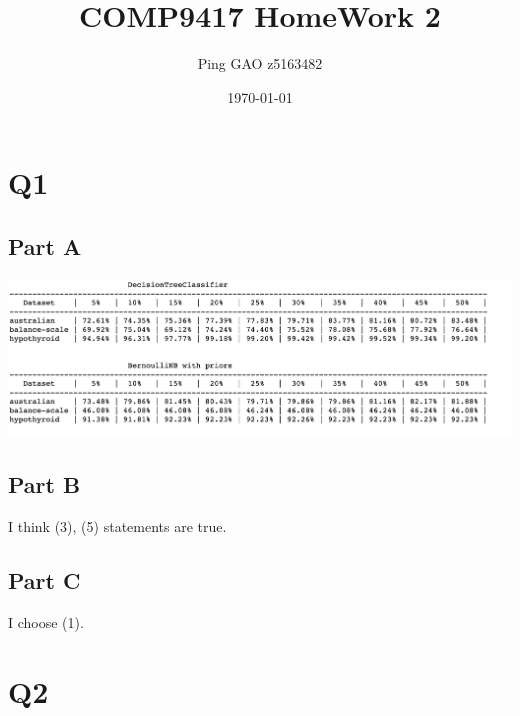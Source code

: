 \documentclass[12pt]{article}
\title{COMP9417 HomeWork 2}
\author{Ping GAO z5163482}
\date{\today}
\begin{document}
    \maketitle
    \section{Q1}\label{sec:q1}
    \subsection{Part A}\label{subsec:part-a}
    \includegraphics[scale=0.18]{result.jpeg}
    \subsection{Part B}\label{subsec:part-b}
    I think (3), (5) statements are true.
    \subsection{Part C}\label{subsec:part-c}
    I choose (1).
    \section{Q2}\label{sec:q2}
\end{document}
